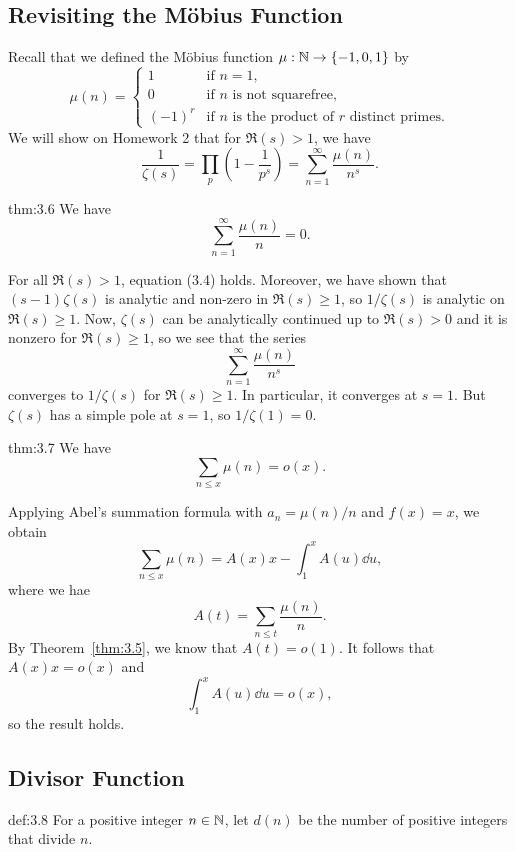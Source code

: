 \subsection{Revisiting the M\"obius Function}\label{subsec:3.3}
Recall that we defined the M\"obius function $\mu : \mathbb{N} \to \{-1, 0, 1\}$ by 
\[ \mu(n) = \begin{cases} 1 & \text{if } n = 1, \\ 0 & \text{if $n$ is not squarefree,} \\ (-1)^r & \text{if $n$ is the product of $r$ distinct primes.} \end{cases} \]
We will show on Homework 2 that for $\Re(s) > 1$, we have 
\[ \frac1{\zeta(s)} = \prod_p \left( 1 - \frac1{p^s} \right) = \sum_{n=1}^\infty \frac{\mu(n)}{n^s}. \]

\begin{theo}{thm:3.6}
We have 
\[ \sum_{n=1}^\infty \frac{\mu(n)}n = 0. \]
\end{theo}
\begin{pf}
For all $\Re(s) > 1$, equation (3.4) holds. Moreover, we have shown that $(s-1)\zeta(s)$ is analytic 
and non-zero in $\Re(s) \geq 1$, so $1/\zeta(s)$ is analytic on $\Re(s) \geq 1$. 
Now, $\zeta(s)$ can be analytically continued up to $\Re(s) > 0$ and it is nonzero for $\Re(s) \geq 1$,
so we see that the series 
\[ \sum_{n=1}^\infty \frac{\mu(n)}{n^s} \] 
converges to $1/\zeta(s)$ for $\Re(s) \geq 1$. In particular, it converges at $s = 1$. But 
$\zeta(s)$ has a simple pole at $s = 1$, so $1/\zeta(1) = 0$. 
\end{pf}

\begin{theo}{thm:3.7}
We have 
\[ \sum_{n\leq x} \mu(n) = o(x). \]
\end{theo}
\begin{pf}
Applying Abel's summation formula with $a_n = \mu(n) / n $ and $f(x) = x$, we obtain 
\[ \sum_{n\leq x} \mu(n) = A(x)x - \int_1^x A(u)\dd u, \]
where we hae 
\[ A(t) = \sum_{n\leq t} \frac{\mu(n)}n. \]
By Theorem~\ref{thm:3.5}, we know that $A(t) = o(1)$. It follows that $A(x) x = o(x)$ and 
\[ \int_1^x A(u)\dd u = o(x), \]
so the result holds. 
\end{pf}

\subsection{Divisor Function}\label{subsec:3.4}

\vspace{2ex}
\begin{defn}{def:3.8}
For a positive integer $n \in \mathbb{N}$, let $d(n)$ be the number of positive integers that 
divide $n$. 
\end{defn}

